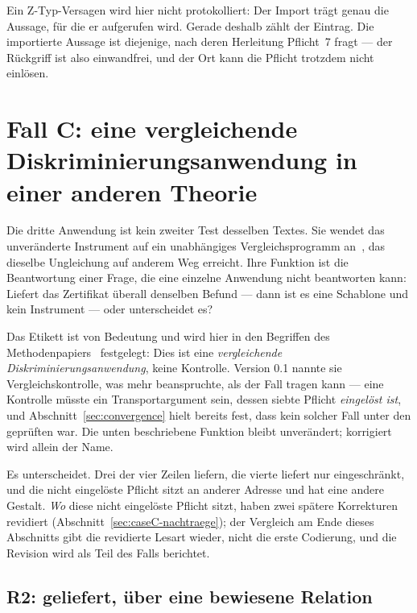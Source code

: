 \documentclass[11pt,a4paper]{article}
\theoremstyle{definition}
\begin{document}
\noindent
Ein Z-Typ-Versagen wird hier nicht protokolliert: Der Import trägt genau die
Aussage, für die er aufgerufen wird. Gerade deshalb zählt der Eintrag. Die
importierte Aussage ist diejenige, nach deren Herleitung Pflicht~7 fragt --- der
Rückgriff ist also einwandfrei, und der Ort kann die Pflicht trotzdem nicht
einlösen.

\section{Fall C: eine vergleichende Diskriminierungsanwendung in einer anderen
Theorie}
\label{sec:caseC}

Die dritte Anwendung ist kein zweiter Test desselben Textes. Sie wendet das
unveränderte Instrument auf ein unabhängiges Vergleichsprogramm an~\cite{JoshiATSIII, JoshiATSIV}, das dieselbe Ungleichung auf anderem Weg
erreicht. Ihre Funktion ist die Beantwortung einer Frage, die eine einzelne
Anwendung nicht beantworten kann: Liefert das Zertifikat überall denselben Befund
--- dann ist es eine Schablone und kein Instrument --- oder unterscheidet es?

Das Etikett ist von Bedeutung und wird hier in den Begriffen des
Methodenpapiers~\cite{GeigerBCM2026} festgelegt: Dies ist eine \emph{vergleichende
Diskriminierungsanwendung}, keine Kontrolle. Version 0.1 nannte sie
Vergleichskontrolle, was mehr beanspruchte, als der Fall tragen kann --- eine
Kontrolle müsste ein Transportargument sein, dessen siebte Pflicht \emph{eingelöst
ist}, und Abschnitt~\ref{sec:convergence} hielt bereits fest, dass kein solcher
Fall unter den geprüften war. Die unten beschriebene Funktion bleibt unverändert;
korrigiert wird allein der Name.

Es unterscheidet. Drei der vier Zeilen liefern, die vierte liefert nur
eingeschränkt, und die nicht eingelöste Pflicht sitzt an anderer Adresse und hat
eine andere Gestalt. \emph{Wo} diese nicht eingelöste Pflicht sitzt, haben zwei
spätere Korrekturen revidiert (Abschnitt~\ref{sec:caseC-nachtraege}); der
Vergleich am Ende dieses Abschnitts gibt die revidierte Lesart wieder, nicht die
erste Codierung, und die Revision wird als Teil des Falls berichtet.

\subsection{R2: geliefert, über eine bewiesene Relation}
\end{document}
